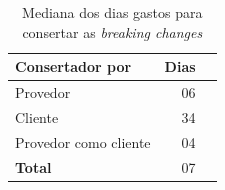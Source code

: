 
\begin{table}
	\centering
	\caption{Mediana dos dias gastos para consertar as \textit{breaking changes}}
	\begin{tabular}{lrr}
		\toprule
		\textbf{Consertador por} & \textbf{Dias} \\ \hline
		Provedor                 & 06            \\
		Cliente                  & 34            \\
		Provedor como cliente    & 04            \\
		\textbf{Total}           & 07            \\ \bottomrule
	\end{tabular}
		\label{tab:fix_day}
\end{table}

